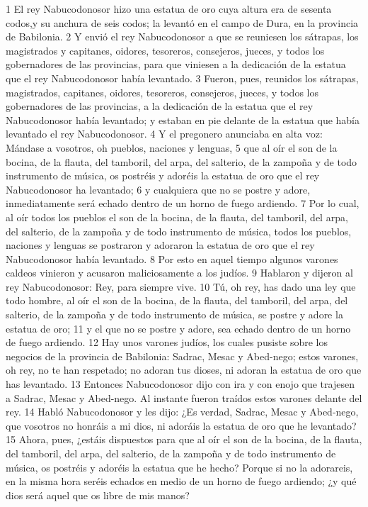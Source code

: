 1 El rey Nabucodonosor hizo una estatua de oro cuya altura era de sesenta codos,y su anchura de seis codos; la levantó en el campo de Dura, en la provincia de Babilonia.
2 Y envió el rey Nabucodonosor a que se reuniesen los sátrapas, los magistrados y capitanes, oidores, tesoreros, consejeros, jueces, y todos los gobernadores de las provincias, para que viniesen a la dedicación de la estatua que el rey Nabucodonosor había levantado.
3 Fueron, pues, reunidos los sátrapas, magistrados, capitanes, oidores, tesoreros, consejeros, jueces, y todos los gobernadores de las provincias, a la dedicación de la estatua que el rey Nabucodonosor había levantado; y estaban en pie delante de la estatua que había levantado el rey Nabucodonosor.
4 Y el pregonero anunciaba en alta voz: Mándase a vosotros, oh pueblos, naciones y lenguas,
5 que al oír el son de la bocina, de la flauta, del tamboril, del arpa, del salterio, de la zampoña y de todo instrumento de música, os postréis y adoréis la estatua de oro que el rey Nabucodonosor ha levantado;
6 y cualquiera que no se postre y adore, inmediatamente será echado dentro de un horno de fuego ardiendo.
7 Por lo cual, al oír todos los pueblos el son de la bocina, de la flauta, del tamboril, del arpa, del salterio, de la zampoña y de todo instrumento de música, todos los pueblos, naciones y lenguas se postraron y adoraron la estatua de oro que el rey Nabucodonosor había levantado.
8 Por esto en aquel tiempo algunos varones caldeos vinieron y acusaron maliciosamente a los judíos.
9 Hablaron y dijeron al rey Nabucodonosor: Rey, para siempre vive.
10 Tú, oh rey, has dado una ley que todo hombre, al oír el son de la bocina, de la flauta, del tamboril, del arpa, del salterio, de la zampoña y de todo instrumento de música, se postre y adore la estatua de oro;
11 y el que no se postre y adore, sea echado dentro de un horno de fuego ardiendo.
12 Hay unos varones judíos, los cuales pusiste sobre los negocios de la provincia de Babilonia: Sadrac, Mesac y Abed-nego; estos varones, oh rey, no te han respetado; no adoran tus dioses, ni adoran la estatua de oro que has levantado.
13 Entonces Nabucodonosor dijo con ira y con enojo que trajesen a Sadrac, Mesac y Abed-nego. Al instante fueron traídos estos varones delante del rey.
14 Habló Nabucodonosor y les dijo: ¿Es verdad, Sadrac, Mesac y Abed-nego, que vosotros no honráis a mi dios, ni adoráis la estatua de oro que he levantado?
15 Ahora, pues, ¿estáis dispuestos para que al oír el son de la bocina, de la flauta, del tamboril, del arpa, del salterio, de la zampoña y de todo instrumento de música, os postréis y adoréis la estatua que he hecho? Porque si no la adorareis, en la misma hora seréis echados en medio de un horno de fuego ardiendo; ¿y qué dios será aquel que os libre de mis manos?

